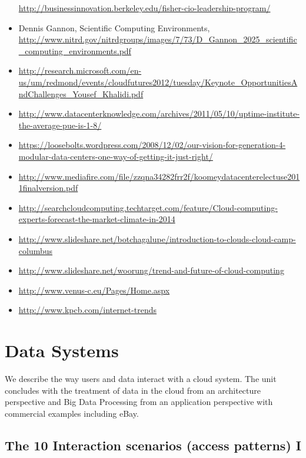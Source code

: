 \begin{itemize}
  \url{http://businessinnovation.berkeley.edu/fisher-cio-leadership-program/}
\item
  Dennis Gannon, Scientific Computing Environments,
  \url{http://www.nitrd.gov/nitrdgroups/images/7/73/D_Gannon_2025_scientific_computing_environments.pdf}
\item
  \url{http://research.microsoft.com/en-us/um/redmond/events/cloudfutures2012/tuesday/Keynote_OpportunitiesAndChallenges_Yousef_Khalidi.pdf}
\item
  \url{http://www.datacenterknowledge.com/archives/2011/05/10/uptime-institute-the-average-pue-is-1-8/}
\item
  \url{https://loosebolts.wordpress.com/2008/12/02/our-vision-for-generation-4-modular-data-centers-one-way-of-getting-it-just-right/}
\item
  \url{http://www.mediafire.com/file/zzqna34282frr2f/koomeydatacenterelectuse2011finalversion.pdf}
\item
  \url{http://searchcloudcomputing.techtarget.com/feature/Cloud-computing-experts-forecast-the-market-climate-in-2014}
\item
  \url{http://www.slideshare.net/botchagalupe/introduction-to-clouds-cloud-camp-columbus}
\item
  \url{http://www.slideshare.net/woorung/trend-and-future-of-cloud-computing}
\item
  \url{http://www.venus-c.eu/Pages/Home.aspx}
\item
  \url{http://www.kpcb.com/internet-trends}
\end{itemize}

\section{Data Systems}

We describe the way users and data interact with a cloud system. The
unit concludes with the treatment of data in the cloud from an
architecture perspective and Big Data Processing from an application
perspective with commercial examples including eBay.


\subsection{The 10 Interaction scenarios (access patterns)
I}\label{the-10-interaction-scenarios-access-patterns-i}

